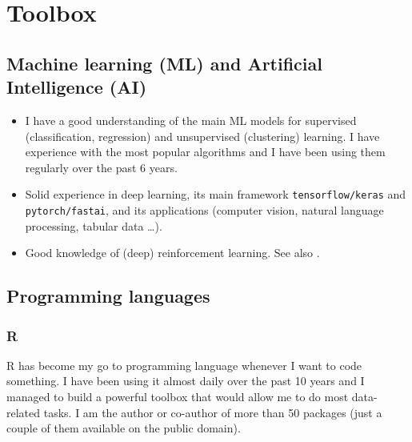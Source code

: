 \documentclass[11pt]{article}
\begin{document}
\section{Toolbox}
\label{sec:org6e35dc1}
\subsection{Machine learning (ML) and Artificial Intelligence (AI)}
\label{sec:org18a0572}
\begin{itemize}
\item I have a good understanding of the main ML models for supervised
(classification, regression) and unsupervised (clustering) learning. I have
experience with the most popular algorithms and I have been using them
regularly over the past 6 years.
\item Solid experience in deep learning, its main framework \texttt{tensorflow/keras}
and \texttt{pytorch/fastai}, and its applications (computer vision, natural
language processing, tabular data \ldots{}).
\item Good knowledge of (deep) reinforcement learning. See also
\cite{kharrat20deep}.
\end{itemize}
\subsection{Programming languages}
\label{sec:orgf1ce182}
\subsubsection{R}
\label{sec:org2b3e36f}
R has become my go to programming language whenever I want to code
something. I have been using it almost daily over the past 10 years and I
managed to build a powerful toolbox that would allow me to do most 
data-related tasks. I am the author or co-author of more than 50 packages
(just a couple of them available on the public domain).
\end{document}
